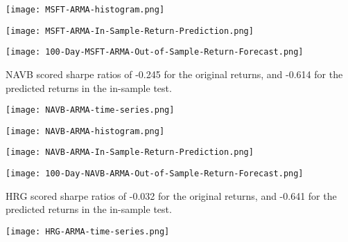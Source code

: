 \begin{center}
    \texttt{[image: MSFT-ARMA-histogram.png]}
    \label{fig:nonfloat}
\end{center}

\begin{center}
    \texttt{[image: MSFT-ARMA-In-Sample-Return-Prediction.png]}
    \label{fig:nonfloat}
\end{center}

\begin{center}
    \texttt{[image: 100-Day-MSFT-ARMA-Out-of-Sample-Return-Forecast.png]}
    \label{fig:nonfloat}
\end{center}

NAVB scored sharpe ratios of -0.245 for the original returns, and -0.614 for the predicted returns in the in-sample test.

\begin{center}  
    \texttt{[image: NAVB-ARMA-time-series.png]}
    \label{fig:nonfloat}
\end{center}

\begin{center}
    \texttt{[image: NAVB-ARMA-histogram.png]}
    \label{fig:nonfloat}
\end{center}

\begin{center}  
    \texttt{[image: NAVB-ARMA-In-Sample-Return-Prediction.png]}
    \label{fig:nonfloat}
\end{center}

\begin{center}  
    \texttt{[image: 100-Day-NAVB-ARMA-Out-of-Sample-Return-Forecast.png]}
    \label{fig:nonfloat}
\end{center}

HRG scored sharpe ratios of -0.032 for the original returns, and -0.641 for the predicted returns in the in-sample test.

\begin{center}
    \texttt{[image: HRG-ARMA-time-series.png]}
    \label{fig:nonfloat}
\end{center}

